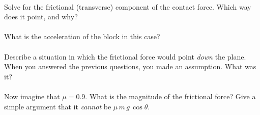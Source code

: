\documentclass[12pt]{article}
\begin{document}
\paragraph{\theproblem}%
Solve for the frictional (transverse) component of the contact force.
Which way does it point, and why?

\paragraph{\theproblem}%
What is the acceleration of the block in this case?

\paragraph{\theproblem}%
Describe a situation in which the frictional force would point
\emph{down} the plane.  When you answered the previous questions, you
made an assumption.  What was it?

\paragraph{\theproblem}%
Now imagine that $\mu=0.9$.  What is the magnitude of the frictional
force? Give a simple argument that it \emph{cannot} be
$\mu\,m\,g\,\cos\theta$.
\end{document}
